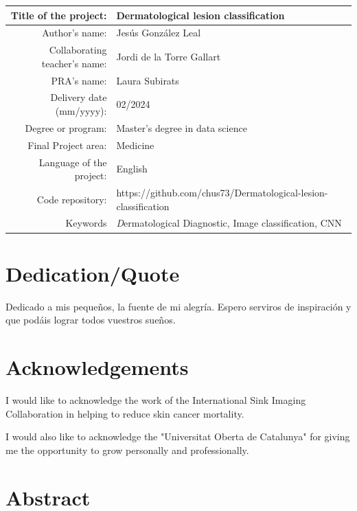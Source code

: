 \begin{table}[ht]
\centering{}
\renewcommand{\arraystretch}{2}
\begin{tabular}{r | l}
\hline
Title of the project: & Dermatological lesion classification\\
\hline
Author's name: & Jesús González Leal\\
\hline
Collaborating teacher's name: & Jordi de la Torre Gallart\\
\hline
PRA's name: & Laura Subirats\\
\hline
Delivery date (mm/yyyy): & 02/2024\\
\hline
Degree or program: & Master’s degree in data science\\
\hline
Final Project area: & Medicine\\
\hline
Language of the project: & English\\
\hline
Code repository: & https://github.com/chus73/Dermatological-lesion-classification\\

\hline
Keywords & \textit Dermatological Diagnostic, Image classification, CNN  \\
\hline
\end{tabular}
\end{table}

\chapter*{Dedication/Quote}

Dedicado a mis pequeños, la fuente de mi alegría. Espero serviros de inspiración y que podáis lograr todos vuestros sueños. 

\chapter*{Acknowledgements}

I would like to acknowledge the work of the International Sink Imaging Collaboration \cite{isic_web} in helping to reduce skin cancer mortality. 

I would also like to acknowledge the "Universitat Oberta de Catalunya" for giving me the opportunity to grow personally and professionally.

\chapter*{Abstract}

